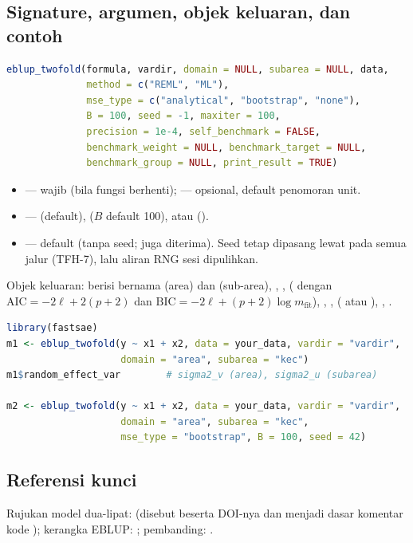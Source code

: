 \subsection{Signature, argumen, objek keluaran, dan contoh}\label{sec:twofold-api}

\begin{lstlisting}[language=R,caption={Signature \texttt{eblup\_twofold} (\texttt{R/eblup\_twofold.R:76-93}).}]
eblup_twofold(formula, vardir, domain = NULL, subarea = NULL, data,
              method = c("REML", "ML"),
              mse_type = c("analytical", "bootstrap", "none"),
              B = 100, seed = -1, maxiter = 100,
              precision = 1e-4, self_benchmark = FALSE,
              benchmark_weight = NULL, benchmark_target = NULL,
              benchmark_group = NULL, print_result = TRUE)
\end{lstlisting}

\begin{itemize}
  \item {} --- wajib (bila  fungsi berhenti);
         --- opsional, default penomoran unit.
  \item {} ---  (default), 
        ($B$ default 100), atau  ().
  \item {} --- default  (tanpa seed;  juga
        diterima). Seed tetap dipasang lewat  pada semua
        jalur (TFH-7), lalu aliran RNG sesi dipulihkan.
\end{itemize}

Objek keluaran:  berisi  bernama
 (area) dan  (sub-area), ,
,  ( dengan
$\mathrm{AIC}=-2\ell+2(p+2)$ dan $\mathrm{BIC}=-2\ell+(p+2)\log m_{\text{fit}}$),
, ,  ( atau ),
, .

\begin{lstlisting}[language=R,caption={Contoh yang dapat dijalankan (dari \texttt{man/eblup\_twofold.Rd}); membutuhkan kolom penanda area dan sub-area.}]
library(fastsae)
m1 <- eblup_twofold(y ~ x1 + x2, data = your_data, vardir = "vardir",
                    domain = "area", subarea = "kec")
m1$random_effect_var        # sigma2_v (area), sigma2_u (subarea)

m2 <- eblup_twofold(y ~ x1 + x2, data = your_data, vardir = "vardir",
                    domain = "area", subarea = "kec",
                    mse_type = "bootstrap", B = 100, seed = 42)
\end{lstlisting}

\subsection{Referensi kunci}\label{sec:twofold-ref}

Rujukan model dua-lipat: \citet{torabi2014small} (disebut
 beserta DOI-nya dan menjadi dasar komentar kode
); kerangka EBLUP: \citet{rao2015small};
pembanding:  \citep{molina2015sae}.
